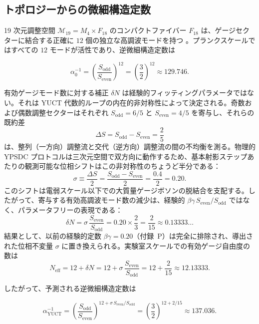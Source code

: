 \documentclass[12pt,a4paper]{article}
\theoremstyle{remark}
\begin{document}
	\subsection{トポロジーからの微細構造定数}
	
	19 次元調整空間 \(\mathcal{M}_{19}=M_4\times F_{18}\) のコンパクトファイバー \(F_{18}\) は、ゲージセクターに結合する正確に \(12\) 個の独立な高調波モードを持つ \cite{AppendixG}。プランクスケールではすべての \(12\) モードが活性であり、逆微細構造定数は
	
	\begin{equation}
		\alpha_0^{-1} = \left(\frac{S_{\mathrm{odd}}}{S_{\mathrm{even}}}\right)^{12}
		= \left(\frac{3}{2}\right)^{12} \approx 129.746 .
	\end{equation}
	
	有効ゲージモード数に対する補正 \(\delta N\) は経験的フィッティングパラメータではない。それは YUCT 代数的ループの内在的非対称性によって決定される。奇数および偶数調整セクターはそれぞれ \(S_{\mathrm{odd}} = 6/5\) と \(S_{\mathrm{even}} = 4/5\) を寄与し、それらの既約差
	\[
	\Delta S = S_{\mathrm{odd}} - S_{\mathrm{even}} = \frac{2}{5}
	\]
	は、整列（一方向）調整流と交代（逆方向）調整流の間の不均衡を測る。物理的 YPSDC プロトコルは三次元空間で双方向に動作するため、基本射影ステップあたりの観測可能な位相シフトはこの非対称性のちょうど半分である：
	\[
	\sigma \equiv \frac{\Delta S}{2} = \frac{S_{\mathrm{odd}} - S_{\mathrm{even}}}{2}
	= \frac{0.4}{2} = 0.20.
	\]
	このシフトは電弱スケール以下での大質量ゲージボソンの脱結合を支配する。したがって、寄与する有効高調波モード数の減少は、経験的 \(\beta\gamma\,S_{\mathrm{even}}/S_{\mathrm{odd}}\) ではなく、パラメータフリーの表現である：
	\[
	\delta N = \sigma \, \frac{S_{\mathrm{even}}}{S_{\mathrm{odd}}}
	= 0.20 \times \frac{2}{3}
	= \frac{2}{15} \approx 0.13333\ldots
	\]
	結果として、以前の経験的定数 \(\beta\gamma = 0.20\)（付録~P）は完全に排除され、導出された位相不変量 \(\sigma\) に置き換えられる。実験室スケールでの有効ゲージ自由度の数は
	\[
	N_{\mathrm{eff}} = 12 + \delta N = 12 + \sigma\,\frac{S_{\mathrm{even}}}{S_{\mathrm{odd}}}
	= 12 + \frac{2}{15} \approx 12.13333 .
	\]
	
	したがって、予測される逆微細構造定数は
	
	\begin{equation}
		\boxed{\alpha^{-1}_{\mathrm{YUCT}} =
			\left(\frac{S_{\mathrm{odd}}}{S_{\mathrm{even}}}\right)^{12 + \sigma\,S_{\mathrm{even}}/S_{\mathrm{odd}}}
			= \left(\frac{3}{2}\right)^{12 + 2/15}
			\approx 137.036 } .
		\label{eq:alpha-yuct}
	\end{equation}
	
\end{document}
